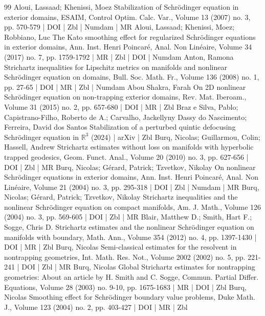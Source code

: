 \begin{thebibliography}{99}
Aloui, Lassaad; Khenissi, Moez Stabilization of Schrödinger equation in exterior domains, ESAIM, Control Optim. Calc. Var., Volume 13 (2007) no. 3, pp. 570-579 | DOI | Zbl | Numdam | MR
Aloui, Lassaad; Khenissi, Moez; Robbiano, Luc The Kato smoothing effect for regularized Schrödinger equations in exterior domains, Ann. Inst. Henri Poincaré, Anal. Non Linéaire, Volume 34 (2017) no. 7, pp. 1759-1792 | MR | Zbl | DOI | Numdam
Anton, Ramona Strichartz inequalities for Lipschitz metrics on manifolds and nonlinear Schrödinger equation on domains, Bull. Soc. Math. Fr., Volume 136 (2008) no. 1, pp. 27-65 | DOI | MR | Zbl | Numdam
Abou Shakra, Farah On 2D nonlinear Schrödinger equation on non-trapping exterior domains, Rev. Mat. Iberoam., Volume 31 (2015) no. 2, pp. 657-680 | DOI | MR | Zbl
Braz e Silva, Pablo; Capistrano-Filho, Roberto de A.; Carvalho, Jackellyny Dassy do Nascimento; Ferreira, David dos Santos Stabilization of a perturbed quintic defocusing Schrödinger equation in $\mathbb{R}^{3}$ (2024) | arXiv | Zbl
Burq, Nicolas; Guillarmou, Colin; Hassell, Andrew Strichartz estimates without loss on manifolds with hyperbolic trapped geodesics, Geom. Funct. Anal., Volume 20 (2010) no. 3, pp. 627-656 | DOI | Zbl | MR
Burq, Nicolas; Gérard, Patrick; Tzvetkov, Nikolay On nonlinear Schrödinger equations in exterior domains, Ann. Inst. Henri Poincaré, Anal. Non Linéaire, Volume 21 (2004) no. 3, pp. 295-318 | DOI | Zbl | Numdam | MR
Burq, Nicolas; Gérard, Patrick; Tzvetkov, Nikolay Strichartz inequalities and the nonlinear Schrödinger equation on compact manifolds, Am. J. Math., Volume 126 (2004) no. 3, pp. 569-605 | DOI | Zbl | MR
Blair, Matthew D.; Smith, Hart F.; Sogge, Chris D. Strichartz estimates and the nonlinear Schrödinger equation on manifolds with boundary, Math. Ann., Volume 354 (2012) no. 4, pp. 1397-1430 | DOI | MR | Zbl
Burq, Nicolas Semi-classical estimates for the resolvent in nontrapping geometries, Int. Math. Res. Not., Volume 2002 (2002) no. 5, pp. 221-241 | DOI | Zbl | MR
Burq, Nicolas Global Strichartz estimates for nontrapping geometries: About an article by H. Smith and C. Sogge, Commun. Partial Differ. Equations, Volume 28 (2003) no. 9-10, pp. 1675-1683 | MR | DOI | Zbl
Burq, Nicolas Smoothing effect for Schrödinger boundary value problems, Duke Math. J., Volume 123 (2004) no. 2, pp. 403-427 | DOI | MR | Zbl

\end{thebibliography}
